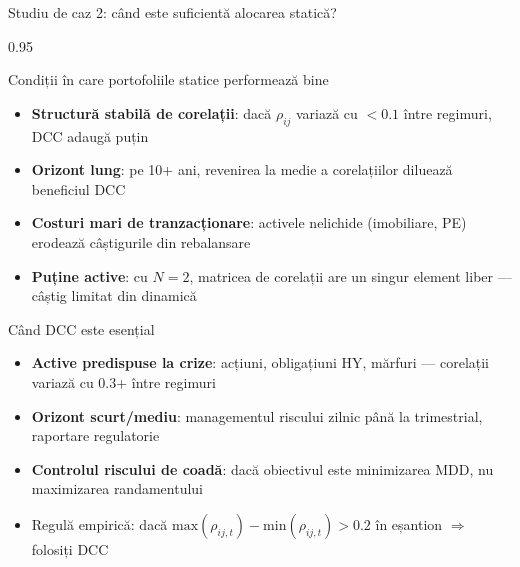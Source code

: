 \documentclass[9pt, aspectratio=169, t]{beamer}
\begin{document}
\begin{frame}{Studiu de caz 2: când este suficientă alocarea statică?}
    \begin{cminipage}{0.95\textwidth}
    {\footnotesize
    \begin{block}{Condiții în care portofoliile statice performează bine}
        \begin{itemize}\setlength{\itemsep}{1pt}
            \item \textbf{Structură stabilă de corelații}: dacă $\rho_{ij}$ variază cu $< 0.1$ între regimuri, DCC adaugă puțin
            \item \textbf{Orizont lung}: pe 10+ ani, revenirea la medie a corelațiilor diluează beneficiul DCC
            \item \textbf{Costuri mari de tranzacționare}: activele nelichide (imobiliare, PE) erodează câștigurile din rebalansare
            \item \textbf{Puține active}: cu $N = 2$, matricea de corelații are un singur element liber --- câștig limitat din dinamică
        \end{itemize}
    \end{block}
    \begin{alertblock}{Când DCC este esențial}
        \begin{itemize}\setlength{\itemsep}{0pt}
            \item \textbf{Active predispuse la crize}: acțiuni, obligațiuni HY, mărfuri --- corelații variază cu 0.3+ între regimuri
            \item \textbf{Orizont scurt/mediu}: managementul riscului zilnic până la trimestrial, raportare regulatorie
            \item \textbf{Controlul riscului de coadă}: dacă obiectivul este minimizarea MDD, nu maximizarea randamentului
            \item Regulă empirică: dacă $\text{max}(\rho_{ij,t}) - \text{min}(\rho_{ij,t}) > 0.2$ în eșantion $\Rightarrow$ folosiți DCC
        \end{itemize}
    \end{alertblock}
    }
    \end{cminipage}
\end{frame}
\end{document}
